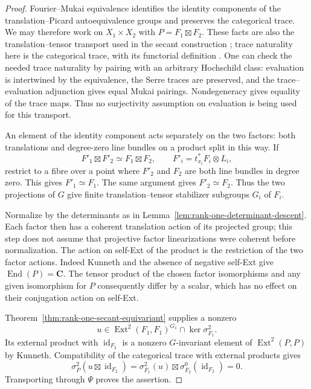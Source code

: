\documentclass[11pt]{article}
\theoremstyle{definition}
\theoremstyle{remark}
\newcommand{\C}{\mathbf C}
\begin{document}
\begin{proof}
Fourier--Mukai equivalence identifies the identity components of
the translation--Picard autoequivalence groups and preserves the
categorical trace.  We may therefore work on $X_1\times X_2$ with
$P=F_1\boxtimes F_2$.  These facts are also the translation--tensor
transport used in the secant construction
\cite[\S1.5 and \S9.3]{MarkmanSecantFourfold}; trace naturality here
is the categorical trace, with its functorial definition
\cite[\S\S4--5 and \S7.3]{CaldararuWillerton}.
One can check the needed trace naturality by pairing with an
arbitrary Hochschild class: evaluation is intertwined by the
equivalence, the Serre traces are preserved, and the trace--evaluation
adjunction gives equal Mukai pairings.  Nondegeneracy gives equality
of the trace maps.  Thus no surjectivity assumption on evaluation is
being used for this transport.

An element of the identity component acts separately on the two
factors: both translations and degree-zero line bundles on a product
split in this way.  If
\[
  F'_1\boxtimes F'_2\simeq F_1\boxtimes F_2,
  \qquad F'_i=t_{x_i}^*F_i\otimes L_i,
\]
restrict to a fibre over a point where $F'_2$ and $F_2$ are both
line bundles in degree zero.  This gives $F'_1\simeq F_1$.
The same argument gives $F'_2\simeq F_2$.  Thus the two projections
of $G$ give finite translation--tensor stabilizer subgroups $G_i$
of $F_i$.

Normalize by the determinants as in
Lemma~\ref{lem:rank-one-determinant-descent}.  Each factor then has
a coherent translation action of its projected group; this step
does not assume that projective factor linearizations were coherent
before normalization.  The action on self-Ext of the product is the
restriction of the two factor actions.  Indeed Kunneth and the
absence of negative self-Ext give $\operatorname{End}(P)=\C$.
The tensor product of the chosen factor isomorphisms and any given
isomorphism for $P$ consequently differ by a scalar, which has no
effect on their conjugation action on self-Ext.

Theorem~\ref{thm:rank-one-secant-equivariant} supplies a nonzero
\[
 u\in\operatorname{Ext}^2(F_1,F_1)^{G_1}
                         \cap\ker\sigma_{F_1}^2.
\]
Its external product with $\operatorname{id}_{F_2}$ is a nonzero
$G$-invariant element of $\operatorname{Ext}^2(P,P)$ by Kunneth.
Compatibility of the categorical trace with external products gives
\[
 \sigma_P^2(u\boxtimes\operatorname{id}_{F_2})
    =\sigma_{F_1}^2(u)\boxtimes
                       \sigma_{F_2}^0(\operatorname{id}_{F_2})=0.
\]
Transporting through $\Psi$ proves the assertion.
\end{proof}
\end{document}

